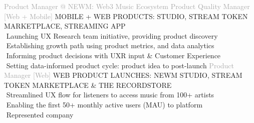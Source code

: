 \begin{cvtable}
    {\textcolor{darkgray} {Product Manager \newline @ NEWM: Web3 Music Ecosystem } }
    { }{{ {    } }}
%
    {\textcolor{darkgray}
    {
    Product Quality Manager [Web + Mobile] %
    }
    }
    { }%
    {
    {
    {\scriptsize
    MOBILE + WEB PRODUCTS:
    STUDIO, STREAM TOKEN MARKETPLACE, STREAMING APP
    } \\
        \textperiodcentered $ $ Launching UX Research team initiative,
providing product discovery \\
     \textperiodcentered $ $ Establishing growth path using product metrics, and data analytics \\
          \textperiodcentered $ $ Informing product decisions
          with UXR input \& Customer Experience
          \\
     \textperiodcentered $ $ Setting data-informed product cycle:
     product idea to post-launch %
    }}
%
%
    {\textcolor{darkgray}{
    Product 
    Manager
    [Web]
    }}%
    {
    }%
    {%
    {\scriptsize
    WEB
    PRODUCT
    LAUNCHES: NEWM STUDIO, STREAM TOKEN MARKETPLACE \& THE RECORDSTORE} \\
\textperiodcentered $ $ Streamlined UX flow for listeners to access music from 100+ artists \\
\textperiodcentered $ $ Enabling the first 50+ monthly active users (MAU) to platform \\
\textperiodcentered $ $
  Represented company %
}
\end{cvtable}
